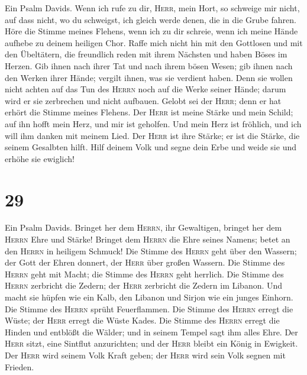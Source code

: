  Ein Psalm Davids. Wenn ich rufe zu dir, \textsc{Herr},
mein Hort, so schweige mir nicht, auf dass nicht, wo du schweigst, ich
gleich werde denen, die in die Grube fahren.  Höre die
Stimme meines Flehens, wenn ich zu dir schreie, wenn ich meine Hände
aufhebe zu deinem heiligen Chor.  Raffe mich nicht hin mit
den Gottlosen und mit den Übeltätern, die freundlich reden mit ihrem
Nächsten und haben Böses im Herzen.  Gib ihnen nach ihrer
Tat und nach ihrem bösen Wesen; gib ihnen nach den Werken ihrer Hände;
vergilt ihnen, was sie verdient haben.  Denn sie wollen
nicht achten auf das Tun des \textsc{Herrn} noch auf die Werke seiner
Hände; darum wird er sie zerbrechen und nicht aufbauen. 
Gelobt sei der \textsc{Herr}; denn er hat erhört die Stimme meines
Flehens.  Der \textsc{Herr} ist meine Stärke und mein
Schild; auf ihn hofft mein Herz, und mir ist geholfen. Und mein Herz ist
fröhlich, und ich will ihm danken mit meinem Lied.  Der
\textsc{Herr} ist ihre Stärke; er ist die Stärke, die seinem Gesalbten
hilft.  Hilf deinem Volk und segne dein Erbe und weide sie
und erhöhe sie ewiglich!

\hypertarget{section-28}{%
\section{29}\label{section-28}}

 Ein Psalm Davids. Bringet her dem \textsc{Herrn}, ihr
Gewaltigen, bringet her dem \textsc{Herrn} Ehre und Stärke!
 Bringet dem \textsc{Herrn} die Ehre seines Namens; betet
an den \textsc{Herrn} in heiligem Schmuck!  Die Stimme des
\textsc{Herrn} geht über den Wassern; der Gott der Ehren donnert, der
\textsc{Herr} über großen Wassern.  Die Stimme des
\textsc{Herrn} geht mit Macht; die Stimme des \textsc{Herrn} geht
herrlich.  Die Stimme des \textsc{Herrn} zerbricht die
Zedern; der \textsc{Herr} zerbricht die Zedern im Libanon.
 Und macht sie hüpfen wie ein Kalb, den Libanon und Sirjon
wie ein junges Einhorn.  Die Stimme des \textsc{Herrn}
sprüht Feuerflammen.  Die Stimme des \textsc{Herrn} erregt
die Wüste; der \textsc{Herr} erregt die Wüste Kades.  Die
Stimme des \textsc{Herrn} erregt die Hinden und entblößt die Wälder; und
in seinem Tempel sagt ihm alles Ehre.  Der \textsc{Herr}
sitzt, eine Sintflut anzurichten; und der \textsc{Herr} bleibt ein König
in Ewigkeit.  Der \textsc{Herr} wird seinem Volk Kraft
geben; der \textsc{Herr} wird sein Volk segnen mit Frieden.

